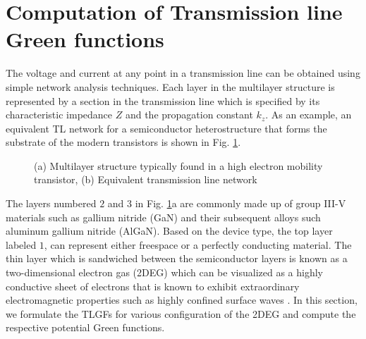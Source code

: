 \section{Computation of Transmission line Green functions}
%
The voltage and current at any point in a transmission line can be obtained \cite{Felsen1994} using simple network analysis techniques. Each layer in the multilayer structure is represented by a section in the transmission line which is specified by its characteristic impedance $Z$ and the propagation constant $k_z$. As an example, an equivalent TL network for a semiconductor heterostructure that forms the substrate of the modern transistors is shown in Fig. \ref{fig:TL_equivalent}.
%
\begin{figure}[t!]
  \centering
  \def\svgwidth{.75\linewidth}
  
  \caption{(a) Multilayer structure typically found in a high electron mobility transistor, (b) Equivalent transmission line network}
  \label{fig:TL_equivalent}
\end{figure}
%
The layers numbered $2$ and $3$ in Fig. \ref{fig:TL_equivalent}a are commonly made up of group III-V materials such as gallium nitride (GaN) and their subsequent alloys such aluminum gallium nitride (AlGaN). Based on the device type, the top layer labeled $1$, can represent either freespace or a perfectly conducting material. The thin layer which is sandwiched between the semiconductor layers is known as a two-dimensional electron gas (2DEG) which can be visualized as a highly conductive sheet of electrons that is known to exhibit extraordinary electromagnetic properties such as highly confined surface waves \cite{Stern1967,Allen1977}. In this section, we formulate the TLGFs for various configuration of the 2DEG and compute the respective potential Green functions.
